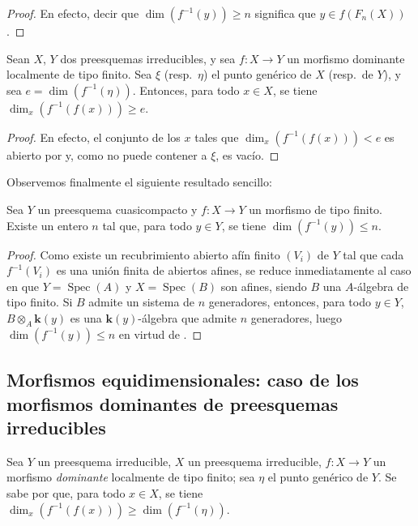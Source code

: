 \begin{proof}
En efecto, decir que $\dim(f^{-1}(y))\geq n$ significa que $y\in f(F_n(X))$ .
\end{proof}

\begin{corollary}[13.1.6]
\label{IV.13.1.6}
Sean $X$, $Y$ dos preesquemas irreducibles, y sea $f:X\to Y$ un morfismo dominante localmente de tipo finito.
Sea $\xi$ \textup{(resp.\ $\eta$)} el punto genérico de $X$ \textup{(resp.\ de $Y$)}, y sea $e=\dim(f^{-1}(\eta))$.
Entonces, para todo $x\in X$, se tiene $\dim_x(f^{-1}(f(x)))\geq e$.
\end{corollary}

\begin{proof}
En efecto, el conjunto de los $x$ tales que $\dim_x(f^{-1}(f(x)))<e$ es abierto por  y, como no puede contener a $\xi$, es vacío.
\end{proof}

Observemos finalmente el siguiente resultado sencillo:

\begin{proposition}[13.1.7]
\label{IV.13.1.7}
Sea $Y$ un preesquema cuasicompacto y $f:X\to Y$ un morfismo de tipo finito.
Existe un entero $n$ tal que, para todo $y\in Y$, se tiene $\dim(f^{-1}(y))\leq n$.
\end{proposition}

\begin{proof}
Como existe un recubrimiento abierto afín finito $(V_i)$ de $Y$ tal que cada $f^{-1}(V_i)$ es una unión finita de abiertos afines, se reduce inmediatamente al caso en que $Y=\operatorname{Spec}(A)$ y $X=\operatorname{Spec}(B)$ son afines, siendo $B$ una $A$-álgebra de tipo finito.
Si $B$ admite un sistema de $n$ generadores, entonces, para todo $y\in Y$, $B\otimes_A\boldsymbol{k}(y)$ es una $\boldsymbol{k}(y)$-álgebra que admite $n$ generadores, luego $\dim(f^{-1}(y))\leq n$ en virtud de .
\end{proof}

\subsection{Morfismos equidimensionales: caso de los morfismos dominantes de preesquemas irreducibles}
\label{subsection:IV.13.2}

\begin{env}[13.2.1]
\label{IV.13.2.1}
Sea $Y$ un preesquema irreducible, $X$ un preesquema irreducible, $f:X\to Y$ un morfismo \emph{dominante} localmente de tipo finito; sea $\eta$ el punto genérico de $Y$.
Se sabe por  que, para todo $x\in X$, se tiene $\dim_x(f^{-1}(f(x)))\geq\dim(f^{-1}(\eta))$.
\end{env}

